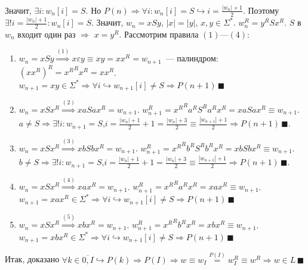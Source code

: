 \documentclass[a4paper]{article}
\begin{document}
\begin{enumerate}[i.]
\begin{enumerate}
\begin{enumerate}[1.]
\\[1pt]
Значит, $\exists i\colon w_n[i]=S$. Но $P(n)\Rightarrow \forall i\colon w_n[i]=S\hookrightarrow i=\frac{|w_n|+1}{2}$. Поэтому $\exists!i=\frac{|w_n|+1}{2}\colon w_n[i]=S$. Значит, $w_n=xSy$, $|x|=|y|$, $x,y\in\Sigma^*$. $w_n^R=y^RSx^R$. $S$ в $w_n$ входит один раз $\Rightarrow$ $x=y^R$.\newline
Рассмотрим правила $(1)$---$(4)$:\begin{enumerate}[(1).]
\item $w_n=xSy\overset{(1)}{\Longrightarrow} x\varepsilon y\equiv xy=xx^R=w_{n+1}$~--- палиндром: $(xx^R)^R={x^R}^Rx^R=xx^R$. $w_{n+1}=xy\in\Sigma^*\Rightarrow\forall i\hookrightarrow w_{n+1}[i]\neq S\Rightarrow P(n+1)\,\blacksquare$
\item $w_n=xSx^R\overset{(2)}{\Longrightarrow}xaSax^R=w_{n+1}$. $w_{n+1}^R={x^R}^Ra^RS^Ra^Rx^R=xaSax^R\equiv w_{n+1}$. $a\neq S\Rightarrow \exists!i\colon w_{n+1}=S$,\newline$i=\frac{|w_n|+1}{2}+1=\frac{|w_n|+3}{2}\equiv\frac{|w_{n+1}|+1}{2}\Rightarrow P(n+1)\,\blacksquare$.
\item $w_n=xSx^R\overset{(3)}{\Longrightarrow}xbSbx^R=w_{n+1}$. $w_{n+1}^R={x^R}^Rb^RS^Rb^Rx^R=xbSbx^R\equiv w_{n+1}$. $b\neq S\Rightarrow \exists!i\colon w_{n+1}=S$,\newline$i=\frac{|w_n|+1}{2}+1=\frac{|w_n|+3}{2}\equiv\frac{|w_{n+1}|+1}{2}\Rightarrow P(n+1)\,\blacksquare$.
\item $w_n=xSx^R\overset{(4)}{\Longrightarrow}xax^R=w_{n+1}$. $w_{n+1}^R={x^R}^Ra^Rx^R=xax^R\equiv w_{n+1}$. $w_{n+1}=xax^R\in\Sigma^*\Rightarrow \forall i\hookrightarrow w_{n+1}[i]\neq S\Rightarrow P(n+1)\,\blacksquare$
\item $w_n=xSx^R\overset{(5)}{\Longrightarrow}xbx^R=w_{n+1}$. $w_{n+1}^R={x^R}^Rb^Rx^R=xbx^R\equiv w_{n+1}$. $w_{n+1}=xbx^R\in\Sigma^*\Rightarrow \forall i\hookrightarrow w_{n+1}[i]\neq S\Rightarrow P(n+1)\,\blacksquare$
\end{enumerate}
Итак, доказано $\forall k\in\overline{0,I}\hookrightarrow P(k)\Rightarrow P(I)\Rightarrow w\equiv w_I\overset{P(I)}{=}w_I^R\equiv w^R\Rightarrow w\in L\,\blacksquare$ 

\end{enumerate}
\end{enumerate}
\end{enumerate}
\end{document}

